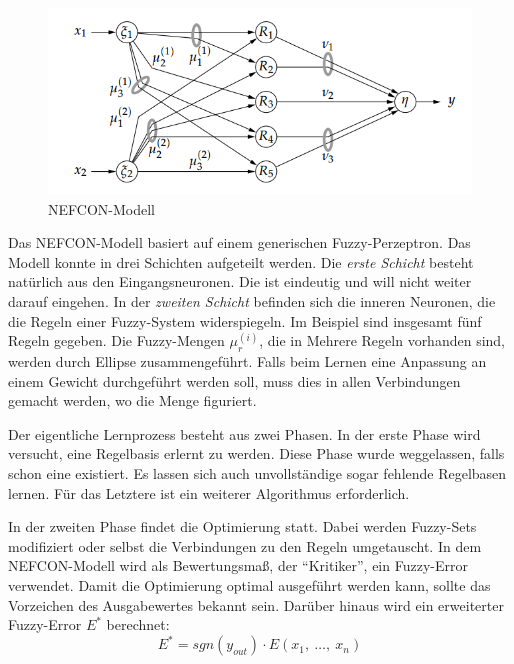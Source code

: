 \begin{figure}[htbp]
	\centering
	\includegraphics[scale=0.5]{images/nefcon_abb.png}
	\caption{NEFCON-Modell \cite{CIKruse:15}}\label{NEFCON_Abb}
\end{figure}



Das NEFCON-Modell basiert auf einem generischen Fuzzy-Perzeptron. Das Modell konnte in drei Schichten aufgeteilt werden. Die \textit{erste Schicht} besteht natürlich aus den Eingangsneuronen. Die ist eindeutig und will nicht weiter darauf eingehen. In der \textit{zweiten Schicht} befinden sich die inneren Neuronen, die die Regeln einer Fuzzy-System widerspiegeln. Im Beispiel sind insgesamt fünf Regeln gegeben. Die Fuzzy-Mengen $\mu_r^{(i)}$, die in Mehrere Regeln vorhanden sind, werden durch Ellipse zusammengeführt. Falls beim Lernen eine Anpassung an einem Gewicht durchgeführt werden soll, muss dies in allen Verbindungen gemacht werden, wo die Menge figuriert.

Der eigentliche Lernprozess besteht aus zwei Phasen. In der erste Phase wird versucht, eine Regelbasis erlernt zu werden. Diese Phase wurde weggelassen, falls schon eine existiert. Es lassen sich auch unvollständige sogar fehlende Regelbasen lernen. Für das Letztere ist ein weiterer Algorithmus erforderlich.

In der zweiten Phase findet die Optimierung statt. Dabei werden Fuzzy-Sets modifiziert oder selbst die Verbindungen zu den Regeln umgetauscht. In dem NEFCON-Modell wird als Bewertungsmaß, der ``Kritiker'', ein Fuzzy-Error verwendet. Damit die Optimierung optimal ausgeführt werden kann, sollte das Vorzeichen des Ausgabewertes bekannt sein. Darüber hinaus wird ein erweiterter Fuzzy-Error $E^*$ berechnet:
\begin{equation}\label{EFE}
E^* = sgn(y_{out})\cdot E(x_1, \ \ldots , \ x_n)
\end{equation}
\cite{CIKruse:15} \cite{UNIMAG:97}
